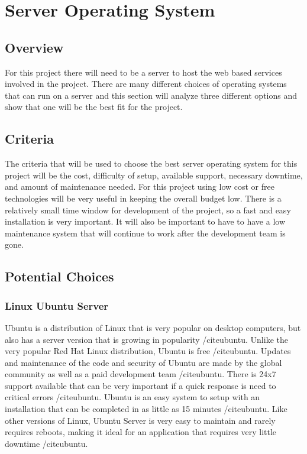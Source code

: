 \documentclass[onecolumn, draftclsnofoot,10pt, compsoc]{IEEEtran}
\begin{document}
\section{Server Operating System}

\subsection{Overview}
For this project there will need to be a server to host the web based services involved in the project. There are many different choices of operating systems that can run on a server and this section will analyze three different options and show that one will be the best fit for the project.

\subsection{Criteria}
The criteria that will be used to choose the best server operating system for this project will be the cost, difficulty of setup, available support, necessary downtime, and amount of maintenance needed. For this project using low cost or free technologies will be very useful in keeping the overall budget low. There is a relatively small time window for development of the project, so a fast and easy installation is very important. It will also be important to have to have a low maintenance system that will continue to work after the development team is gone.

\subsection{Potential Choices}

\subsubsection{Linux Ubuntu Server}
Ubuntu is a distribution of Linux that is very popular on desktop computers, but also has a server version that is growing in popularity /cite{ubuntu}. Unlike the very popular Red Hat Linux distribution, Ubuntu is free /cite{ubuntu}. Updates and maintenance of the code and security of Ubuntu are made by the global community as well as a paid development team /cite{ubuntu}. There is 24x7 support available that can be very important if a quick response is need to critical errors /cite{ubuntu}. Ubuntu is an easy system to setup with an installation that can be completed in as little as 15 minutes /cite{ubuntu}. Like other versions of Linux, Ubuntu Server is very easy to maintain and rarely requires reboots, making it ideal for an application that requires very little downtime /cite{ubuntu}. 
\end{document}
